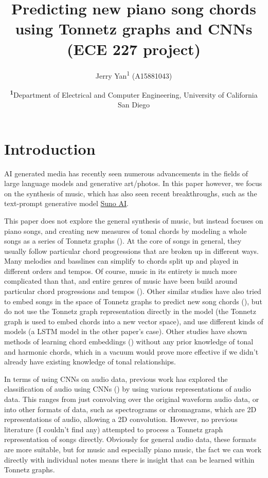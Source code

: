 \documentclass[
	a4paper, %
	10pt, %
	unnumberedsections, %
	twoside, %
]{LTJournalArticle}
\title{Predicting new piano song chords using Tonnetz graphs and CNNs (ECE 227 project)} %
\author{%
	Jerry Yan\textsuperscript{1} (A15881043)
}
\date{\footnotesize\textsuperscript{\textbf{1}}Department of Electrical and Computer Engineering, University of California San Diego}
\begin{document}
\maketitle %


\section{Introduction}

AI generated media has recently seen numerous advancements in the fields of large language models and generative art/photos. In this paper however, we focus on the synthesis of music, which has also seen recent breakthroughs, such as the text-prompt generative model \hyperlink{https://suno.com/}{Suno AI}.

This paper does not explore the general synthesis of music, but instead focuses on piano songs, and creating new measures of tonal chords by modeling a whole songs as a series of Tonnetz graphs (\textcite{tymoczko_generalized_2012}). At the core of songs in general, they usually follow particular chord progressions that are broken up in different ways. Many melodies and basslines can simplify to chords split up and played in different orders and tempos. Of course, music in its entirety is much more complicated than that, and entire genres of music have been build around particular chord progressions and tempos (\textcite{pressing_black_2002}). Other similar studies have also tried to embed songs in the space of Tonnetz graphs to predict new song chords (\textcite{aminian_exploring_2020}), but do not use the Tonnetz graph representation directly in the model (the Tonnetz graph is used to embed chords into a new vector space), and use different kinds of models (a LSTM model in the other paper's case). Other studies have shown methods of learning chord embeddings (\textcite{madjiheurem_chord2vec_2016}) without any prior knowledge of tonal and harmonic chords, which in a vacuum would prove more effective if we didn't already have existing knowledge of tonal relationships.

In terms of using CNNs on audio data, previous work has explored the classification of audio using CNNs (\textcite{hershey_cnn_2017, palanisamy_rethinking_2020}) by using various representations of audio data. This ranges from just convolving over the original waveform audio data, or into other formats of data, such as spectrograms or chromagrams, which are 2D representations of audio, allowing a 2D convolution. However, no previous literature (I couldn't find any) attempted to process a Tonnetz graph representation of songs directly. Obviously for general audio data, these formats are more suitable, but for music and especially piano music, the fact we can work directly with individual notes means there is insight that can be learned within Tonnetz graphs.
\end{document}
